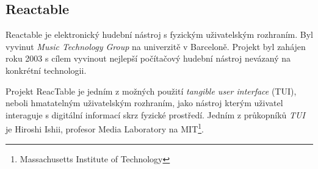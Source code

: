 \documentclass[thesis=B, czech]{FITthesis}[2019/03/06]
\begin{document}
\subsection*{Reactable}

Reactable\cite{reactable} je elektronický hudební nástroj s fyzickým uživatelským rozhraním. Byl vyvinut \textit{Music Technology Group} na univerzitě v Barceloně. Projekt byl zahájen roku 2003 s cílem vyvinout nejlepší počítačový hudební nástroj nevázaný na konkrétní technologii.

Projekt ReacTable je jedním z možných použití \textit{tangible user interface} (TUI), neboli hmatatelným uživatelským rozhraním, jako nástroj kterým uživatel interaguje s digitální informací skrz fyzické prostředí. Jedním z průkopníků \textit{TUI} je Hiroshi Ishii, profesor Media Laboratory na MIT\footnote{Massachusetts Institute of Technology}. 
\end{document}
